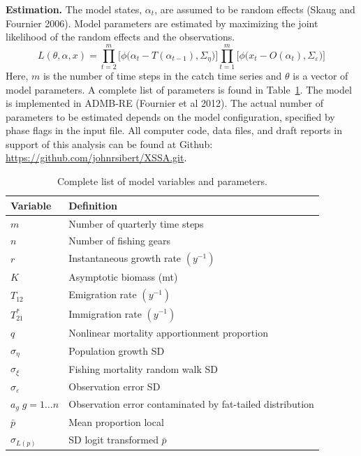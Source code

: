 \documentclass[12pt,letterpaper,twoside]{article}
\begin{document}
{\bf Estimation.} The model states, $\alpha_t$, are assumed to be random
effects (Skaug and Fournier 2006). Model parameters are estimated by
maximizing the joint likelihood of the random
effects and the observations.
\begin{equation}
L(\theta,\alpha,x)=
\prod^m_{t=2}\big[\phi\big(\alpha_t-T(\alpha_{t-1}), \Sigma_\eta\big)\big]
\prod^m_{t=1}\big[\phi\big(x_t-O(\alpha_t), \Sigma_\varepsilon\big)\big]
\end{equation}
Here, $m$ is the number of time steps in the catch time series and
$\theta$ is a vector of model parameters. A complete list of
parameters is found in Table~\ref{tab:allvars}. 
The model is implemented in ADMB-RE (Fournier et al 2012).
The actual number of
parameters to be estimated depends on the model configuration,
specified by phase flags in the input file. 
All computer code, data files, and draft reports in support of this
analysis can be found at Github:\linebreak
\url{https://github.com/johnrsibert/XSSA.git}.


\begin{table}
\caption{Complete list of model variables and parameters.
\label{tab:allvars}}
\begin{center}
\begin{tabular}{ll}
\hline
Variable & Definition\\
\hline
\hline
$m$ & Number of quarterly time steps\\
$n$ & Number of fishing gears\\
\hline
\hline
$r$ & Instantaneous growth rate $(y^{-1})$\\
$K$ & Asymptotic biomass (mt) \\
$T_{12}$ & Emigration rate $(y^{-1})$\\
$T^*_{21}$& Immigration rate $(y^{-1})$\\
$q$ & Nonlinear mortality apportionment proportion\\
\hline
$\sigma_\eta$ & Population growth SD\\
$\sigma_\xi$ & Fishing mortality random walk SD\\
$\sigma_\varepsilon$ & Observation error SD \\
$a_g\; g=1\ldots n$ & Observation error contaminated by 
fat-tailed distribution\\
\hline
$\bar{p}$ & Mean proportion local\\
$\sigma_{L(p)}$ & SD logit transformed $\bar{p}$\\
\hline
\end{tabular}
\end{center}
\end{table}
\end{document}
